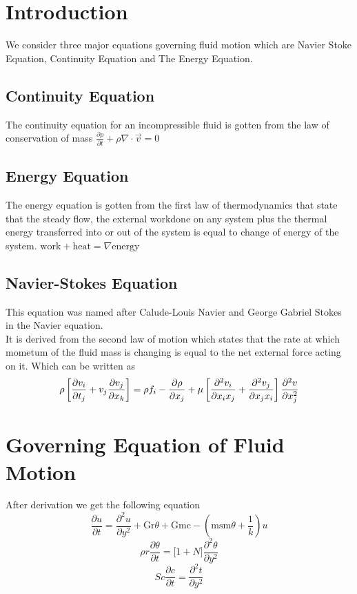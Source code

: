 \documentclass[12pt]{report}
\newcommand{\sps}{\\[0.2cm]}
\newcommand{\dsp}{\displaystyle}
\begin{document}
	\section{Introduction}
	We consider three major equations governing fluid motion which are Navier Stoke Equation, Continuity Equation and The Energy Equation.\\
	
	\subsection{Continuity Equation}
	The continuity equation for an incompressible fluid is gotten from the law of conservation of mass $\dsp \frac{\partial \rho}{\partial t} + \rho \nabla \cdot \vec{v} = 0 $
	
	\subsection{Energy Equation}
	The energy equation is gotten from the first law of thermodynamics that state that the steady flow, the external workdone on any system plus the thermal energy transferred into or out of the system is equal to change of energy of the system. \quad\quad $\mathrm{work + heat} = \nabla\mathrm{energy}$
	
	\subsection{Navier-Stokes Equation}
	This equation was named after Calude-Louis Navier and George Gabriel Stokes in the Navier equation.\sps
	It is derived from the second law of motion which states that the rate at which mometum of the fluid mass is changing is equal to the net external force acting on it. Which can be written as
	\begin{eqnarray}
		\rho\left[\frac{\partial v_i}{\partial t_j} + v_j\frac{\partial v_j}{\partial x_k}\right] = \rho f_i -\frac{\partial\rho}{\partial x_j} + \mu \left[\frac{\partial^2v_i}{\partial x_i x_j} + \frac{\partial^2 v_j}{\partial x_jx_i}\right]\frac{\partial^2v}{\partial x^2_j}\notag
	\end{eqnarray}
	
	\section{Governing Equation of Fluid Motion}
	After derivation we get the following equation
	\begin{equation*}
		\frac{\partial u}{\partial t} = \frac{\partial^2 u}{\partial y^2} + \mathrm{Gr}\theta + \mathrm{Gmc} - \left(\mathrm{msm}\theta + \frac{1}{k}\right)u
	\end{equation*}
	\begin{equation*}
		\rho r\frac{\partial\theta}{\partial t} = \Big[1 + N\Big]\frac{\partial^2\theta}{\partial y^2}
	\end{equation*}
	\begin{equation*}
		Sc\frac{\partial c}{\partial t} = \frac{\partial^2 t}{\partial y^2}
	\end{equation*}
\end{document}
